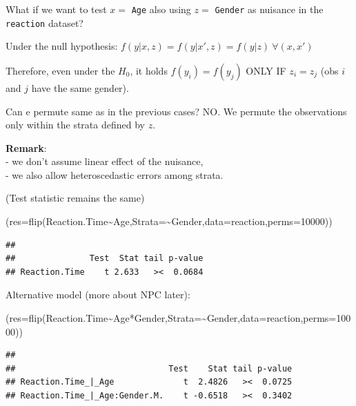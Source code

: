 \documentclass[
]{article}
\newenvironment{Shaded}{\begin{snugshade}}{\end{snugshade}}
\newcommand{\AttributeTok}[1]{\textcolor[rgb]{0.77,0.63,0.00}{#1}}
\newcommand{\DecValTok}[1]{\textcolor[rgb]{0.00,0.00,0.81}{#1}}
\newcommand{\FunctionTok}[1]{\textcolor[rgb]{0.00,0.00,0.00}{#1}}
\newcommand{\NormalTok}[1]{#1}
\newcommand{\SpecialCharTok}[1]{\textcolor[rgb]{0.00,0.00,0.00}{#1}}
\begin{document}
What if we want to test \(x=\) \texttt{Age} also using \(z=\)
\texttt{Gender} as nuisance in the \texttt{reaction} dataset?

Under the null hypothesis:
\(f(y|x,z)=f(y|x',z)=f(y|z) \ \forall (x,x')\)

Therefore, even under the \(H_0\), it holds \(f(y_i)=f(y_j)\) ONLY IF
\(z_i=z_j\) (obs \(i\) and \(j\) have the same gender).

Can e permute same as in the previous cases? NO. We permute the
observations only within the strata defined by \(z\).

\textbf{Remark}:\\
- we don't assume linear effect of the nuisance,\\
- we also allow heteroscedastic errors among strata.

(Test statistic remains the same)

\begin{Shaded}
\begin{Highlighting}[]
\NormalTok{(}\AttributeTok{res=}\FunctionTok{flip}\NormalTok{(Reaction.Time}\SpecialCharTok{\textasciitilde{}}\NormalTok{Age,}\AttributeTok{Strata=}\SpecialCharTok{\textasciitilde{}}\NormalTok{Gender,}\AttributeTok{data=}\NormalTok{reaction,}\AttributeTok{perms=}\DecValTok{10000}\NormalTok{))}
\end{Highlighting}
\end{Shaded}

\begin{verbatim}
## 
##               Test  Stat tail p-value
## Reaction.Time    t 2.633   ><  0.0684
\end{verbatim}

Alternative model (more about NPC later):

\begin{Shaded}
\begin{Highlighting}[]
\NormalTok{(}\AttributeTok{res=}\FunctionTok{flip}\NormalTok{(Reaction.Time}\SpecialCharTok{\textasciitilde{}}\NormalTok{Age}\SpecialCharTok{*}\NormalTok{Gender,}\AttributeTok{Strata=}\SpecialCharTok{\textasciitilde{}}\NormalTok{Gender,}\AttributeTok{data=}\NormalTok{reaction,}\AttributeTok{perms=}\DecValTok{10000}\NormalTok{))}
\end{Highlighting}
\end{Shaded}

\begin{verbatim}
## 
##                               Test    Stat tail p-value
## Reaction.Time_|_Age              t  2.4826   ><  0.0725
## Reaction.Time_|_Age:Gender.M.    t -0.6518   ><  0.3402
\end{verbatim}
\end{document}
